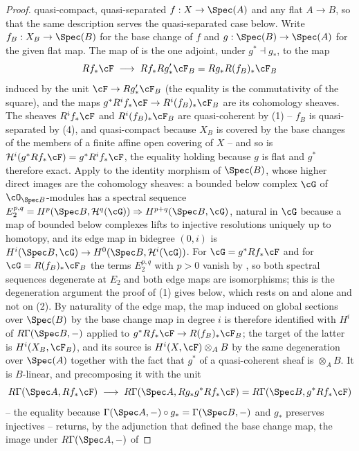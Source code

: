 \begin{proof}
quasi-compact, quasi-separated $f:X\to\Spec(A)$ and any flat $A\to B$,
so that the same description serves the quasi-separated case below.
Write $f_B:X_B\to\Spec(B)$ for the base change of $f$ and
$g:\Spec(B)\to\Spec(A)$ for the given flat map.  The map of
 is the one adjoint, under
$g^*\dashv g_*$, to the map
\[
Rf_*\cF\;\longrightarrow\;Rf_*Rg'_*\cF_B=Rg_*R(f_B)_*\cF_B
\]
induced by the unit $\cF\to Rg'_*\cF_B$ (the equality is the
commutativity of the square), and the maps
$g^*R^if_*\cF\to R^i(f_B)_*\cF_B$ are its cohomology sheaves.  The
sheaves $R^if_*\cF$ and $R^i(f_B)_*\cF_B$ are quasi-coherent by
(1) -- $f_B$ is quasi-separated by
(4), and quasi-compact because $X_B$
is covered by the base changes of the members of a finite affine open
covering of $X$ -- and so is
$\mathcal H^i(g^*Rf_*\cF)=g^*R^if_*\cF$, the equality holding because
$g$ is flat and $g^*$ therefore exact.  Apply
 to the identity morphism of
$\Spec(B)$, whose higher direct images are the cohomology sheaves: a
bounded below complex $\cG$ of $\cO_{\Spec B}$-modules has a spectral
sequence
$E_2^{p,q}=H^p(\Spec B,\mathcal H^q(\cG))\Rightarrow
H^{p+q}(\Spec B,\cG)$, natural in $\cG$ because a map of bounded below
complexes lifts to injective resolutions uniquely up to homotopy, and
its edge map in bidegree $(0,i)$ is
$H^i(\Spec B,\cG)\to H^0(\Spec B,\mathcal H^i(\cG))$.  For
$\cG=g^*Rf_*\cF$ and for $\cG=R(f_B)_*\cF_B$ the terms $E_2^{p,q}$
with $p>0$ vanish by , so both spectral
sequences degenerate at $E_2$ and both edge maps are isomorphisms; this
is the degeneration argument the proof of (1) gives below, which rests
on  and 
alone and not on (2).  By naturality of the edge map, the map induced
on global sections over $\Spec(B)$ by the base change map in degree $i$
is therefore identified with $H^i$ of $R\Gamma(\Spec B,-)$ applied to
$g^*Rf_*\cF\to R(f_B)_*\cF_B$; the target of the latter is
$H^i(X_B,\cF_B)$, and its source is $H^i(X,\cF)\otimes_AB$ by the same
degeneration over $\Spec(A)$ together with the fact that $g^*$ of a
quasi-coherent sheaf is $\otimes_AB$.  It is $B$-linear, and
precomposing it with the unit
\[
R\Gamma(\Spec A,Rf_*\cF)\;\longrightarrow\;
R\Gamma(\Spec A,Rg_*g^*Rf_*\cF)=R\Gamma(\Spec B,g^*Rf_*\cF)
\]
-- the equality because $\Gamma(\Spec A,-)\circ g_*=\Gamma(\Spec B,-)$
and $g_*$ preserves injectives -- returns, by the adjunction that
defined the base change map, the image under $R\Gamma(\Spec A,-)$ of

\end{proof}
